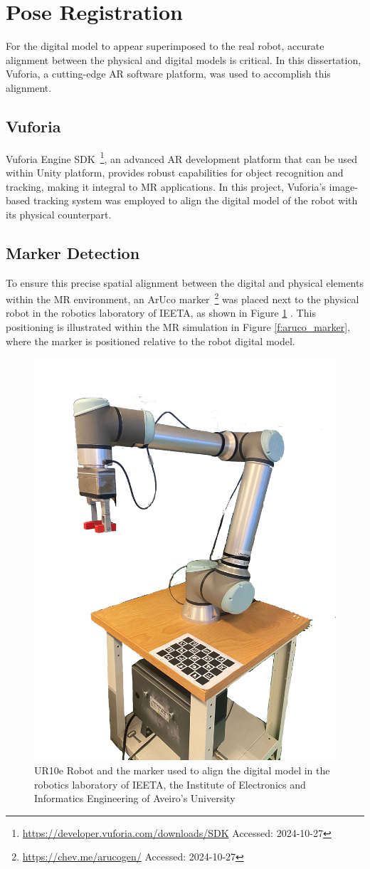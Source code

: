 \section{Pose Registration}
For the digital model to appear superimposed to the real robot, accurate alignment between the physical and digital models is critical. In this dissertation, Vuforia, a cutting-edge \ac{AR} software platform, was used to accomplish this alignment.

\subsection{Vuforia}
\label{section:marker-detection}

Vuforia Engine \ac{SDK}~\footnote{\url{https://developer.vuforia.com/downloads/SDK} Accessed: 2024-10-27}, an advanced \ac{AR} development platform that can be used within Unity platform, provides robust capabilities for object recognition and tracking, making it integral to \ac{MR} applications. In this project, Vuforia's image-based tracking system was employed to align the digital model of the robot with its physical counterpart.

\subsection{Marker Detection}

To ensure this precise spatial alignment between the digital and physical elements within the \ac{MR} environment, an ArUco marker~\footnote{\url{https://chev.me/arucogen/} Accessed: 2024-10-27} was placed next to the physical robot in the robotics laboratory of IEETA, as shown in Figure \ref{f:ur10e_iris} . This positioning is illustrated within the \ac{MR} simulation in Figure \ref{f:aruco_marker}, where the marker is positioned relative to the robot digital model. 

\begin{figure}[h]
    \centering
    \includegraphics[width=0.35\linewidth]{figs/robot-marker.png}
    \caption{UR10e Robot and the marker used to align the digital model in the robotics laboratory of IEETA, the Institute of Electronics and Informatics Engineering of Aveiro's University}
    \label{f:ur10e_iris}
\end{figure}

